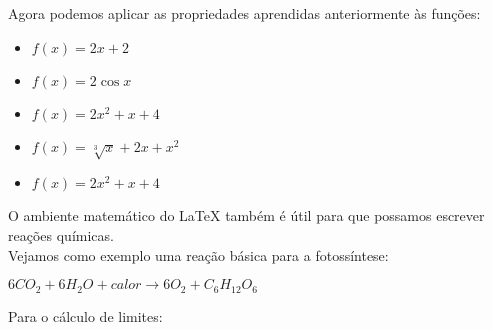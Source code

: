 \documentclass[a4paper, 12pt]{article}
\begin{document}
Agora podemos aplicar as propriedades aprendidas anteriormente às funções:
\begin{itemize}
\item $f(x) = 2x + 2$
\item $f(x) = 2\cos x$
\item $f(x) = 2x^{2} + x + 4$
\item $f(x) = \sqrt[3]{x} + 2x + x^{2}$
\item $f(x) = 2x^{2} + x + 4$
\end{itemize}

O ambiente matemático do LaTeX também é útil para que possamos escrever reações químicas.\\

Vejamos como exemplo uma reação básica para a fotossíntese:\\
\begin{center}
$6 CO_{2} + 6 H_{2}O + calor \rightarrow 6 O_{2} + C_{6}H_{12}O_{6}$
\end{center}

Para o cálculo de limites:
\end{document}
